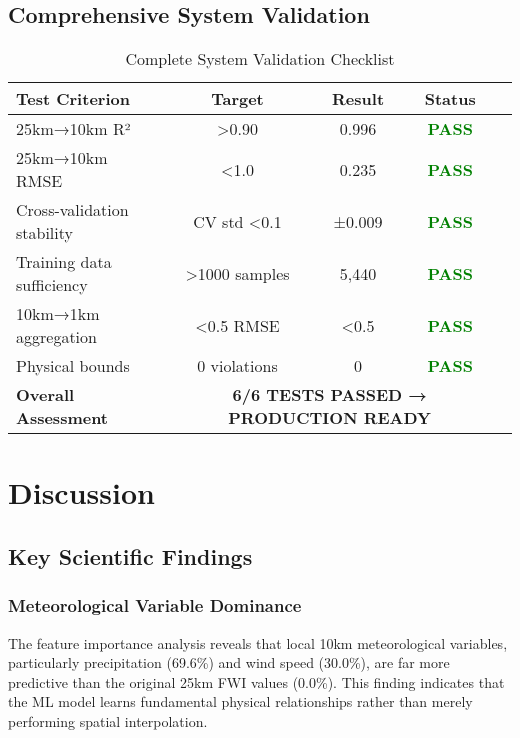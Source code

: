 \documentclass[11pt,a4paper]{article}
\begin{document}
\subsection{Comprehensive System Validation}

\begin{table}[H]
\centering
\caption{Complete System Validation Checklist}
\begin{tabular}{@{}lcccc@{}}
\toprule
\textbf{Test Criterion} & \textbf{Target} & \textbf{Result} & \textbf{Status} \\
\midrule
25km→10km R² & >0.90 & 0.996 & \textcolor{green}{\textbf{PASS}} \\
25km→10km RMSE & <1.0 & 0.235 & \textcolor{green}{\textbf{PASS}} \\
Cross-validation stability & CV std <0.1 & ±0.009 & \textcolor{green}{\textbf{PASS}} \\
Training data sufficiency & >1000 samples & 5,440 & \textcolor{green}{\textbf{PASS}} \\
10km→1km aggregation & <0.5 RMSE & <0.5 & \textcolor{green}{\textbf{PASS}} \\
Physical bounds & 0 violations & 0 & \textcolor{green}{\textbf{PASS}} \\
\midrule
\textbf{Overall Assessment} & \multicolumn{3}{c}{\textbf{6/6 TESTS PASSED → PRODUCTION READY}} \\
\bottomrule
\end{tabular}
\label{tab:system_validation}
\end{table}

\section{Discussion}

\subsection{Key Scientific Findings}

\subsubsection{Meteorological Variable Dominance}
The feature importance analysis reveals that local 10km meteorological variables, particularly precipitation (69.6\%) and wind speed (30.0\%), are far more predictive than the original 25km FWI values (0.0\%). This finding indicates that the ML model learns fundamental physical relationships rather than merely performing spatial interpolation.
\end{document}
